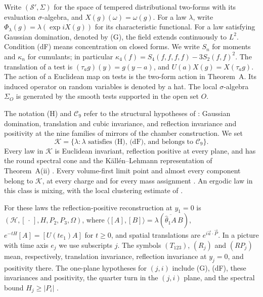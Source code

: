 \documentclass[11pt]{amsart}
\theoremstyle{definition}
\begin{document}
Write $(\mathcal S',\Sigma)$ for the space of tempered distributional
two-forms with its evaluation $\sigma$-algebra, and $X(g)(\omega)=\omega(g)$.
For a law $\lambda$, write
$\Phi_\lambda(g)=\lambda(\exp iX(g))$ for its characteristic functional.
For a law satisfying Gaussian domination, denoted by (G), the field
extends continuously to $L^2$. Condition (dF) means concentration on
closed forms. We write $S_n$ for moments and $\kappa_n$ for cumulants;
in particular $\kappa_4(f)=S_4(f,f,f,f)-3S_2(f,f)^2$.
The translation of a test is $(\tau_ag)(y)=g(y-a)$, and
$U(a)X(g)=X(\tau_ag)$. The action of a Euclidean map on tests is the
two-form action in Theorem~A. Its induced operator on random variables
is denoted by a hat. The local $\sigma$-algebra $\Sigma_O$ is generated by
the smooth tests supported in the open set $O$.

The notation (H) and $\mathcal C_9$ refer to the structural hypotheses
of \cite[Definition~2.38]{QEDII}: Gaussian domination, translation and
cubic invariance, and reflection invariance and positivity at the nine
families of mirrors of the chamber construction. We set
\[
\mathcal K=\{\lambda:\lambda\text{ satisfies (H), (dF), and belongs to }\mathcal C_9\}.
\]
Every law in $\mathcal K$ is Euclidean invariant, reflection positive
at every plane, and has the round spectral cone and the
K\"all\'en--Lehmann representation of Theorem~A(ii)
\cite[Theorem~1.4, Part~I]{QEDII}.
Every volume-first limit point and almost every component belong to
$\mathcal K$, at every charge and for every mass assignment
\cite[Theorem~1.3]{QEDII}. An ergodic law in this class is mixing, with
the local clustering estimate of \cite[Theorem~12.39]{QEDII}.

For these laws the reflection-positive reconstruction at $y_1=0$ is
$(\mathcal H,[\,\cdot\,],H,P_2,P_3,\Omega)$, where
$\langle[A],[B]\rangle=\lambda(\overline{\widehat\theta_1A}\,B)$,
$e^{-tH}[A]=[U(te_1)A]$ for $t\ge0$, and spatial translations are
$e^{i\vec a\cdot\vec P}$. In a picture with time axis $e_j$ we use
subscripts $j$. The symbols $(T_{123})$, $(R_j)$ and $(RP_j)$ mean,
respectively, translation invariance, reflection invariance at $y_j=0$,
and positivity there. The one-plane hypotheses for $(j,i)$ include
(G), (dF), these invariances and positivity, the quarter turn in the
$(j,i)$ plane, and the spectral bound $H_j\ge|P_i|$
\cite[Definition~14.2]{QEDII}.
\end{document}
